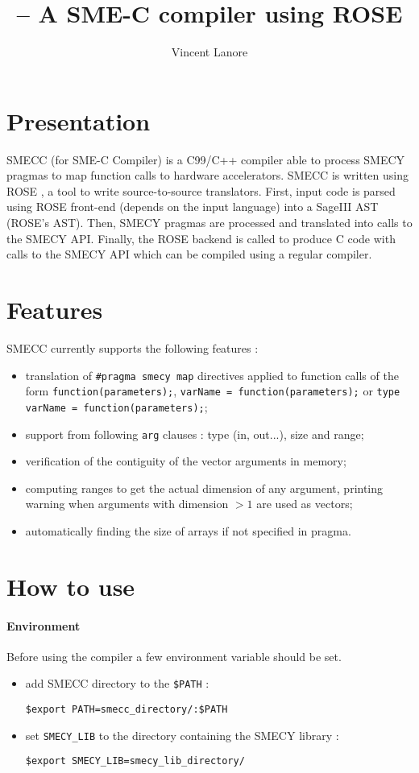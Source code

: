 \documentclass[A4]{article}
\title{\scompiler -- A SME-C compiler using ROSE}
\author{Vincent \sc Lanore}
\newcommand{\scompiler}{SMECC }
\begin{document}
	\maketitle

	\section{Presentation}
		\scompiler (for SME-C Compiler) is a C99/C++ compiler able to process SMECY pragmas to map function calls to hardware accelerators. \scompiler is written using ROSE \cite{rose}, a tool to write source-to-source translators. First, input code is parsed using ROSE front-end (depends on the input language) into a SageIII AST (ROSE's AST). Then, SMECY pragmas are processed and translated into calls to the SMECY API. Finally, the ROSE backend is called to produce C code with calls to the SMECY API which can be compiled using a regular compiler.
	
	\section{Features}
		\scompiler currently supports the following features :
		\begin{itemize}
			\item translation of \verb+#pragma smecy map+ directives applied to function calls of the form \verb+function(parameters);+, \verb+varName = function(parameters);+ or \verb+type varName = function(parameters);+;
			\item support from following \verb+arg+ clauses : type (in, out...), size and range;
			\item verification of the contiguity of the vector arguments in memory;
			\item computing ranges to get the actual dimension of any argument, printing warning when arguments with dimension $>1$ are used as vectors;
			\item automatically finding the size of arrays if not specified in pragma.
		\end{itemize}
	
	\section{How to use}
		\paragraph{Environment} Before using the compiler a few environment variable should be set.
		\begin{itemize}
			\item add \scompiler directory to the \verb+$PATH+ : \begin{verbatim}$export PATH=smecc_directory/:$PATH\end{verbatim}
			\item set \verb+SMECY_LIB+ to the directory containing the SMECY library : \begin{verbatim}$export SMECY_LIB=smecy_lib_directory/\end{verbatim}
		\end{itemize}
		
\end{document}
